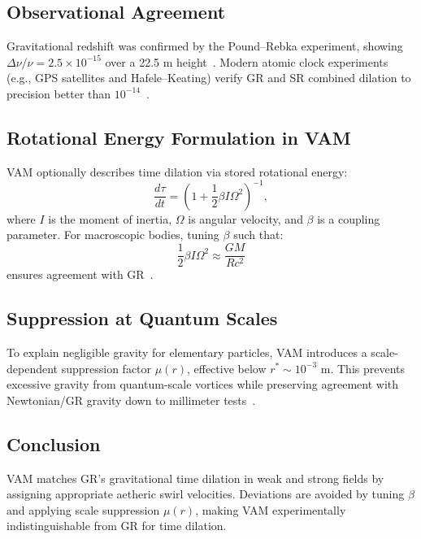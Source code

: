 \subsection*{Observational Agreement}
Gravitational redshift was confirmed by the Pound–Rebka experiment, showing $\Delta\nu/\nu = 2.5\times 10^{-15}$ over a 22.5 m height~\cite{pound1960apparent}. Modern atomic clock experiments (e.g., GPS satellites and Hafele–Keating) verify GR and SR combined dilation to precision better than $10^{-14}$~\cite{ashby2003relativity}.

\subsection*{Rotational Energy Formulation in VAM}
VAM optionally describes time dilation via stored rotational energy:
\[
    \frac{d\tau}{dt} = \left(1 + \frac{1}{2}\beta I \Omega^2\right)^{-1},
\]
where $I$ is the moment of inertia, $\Omega$ is angular velocity, and $\beta$ is a coupling parameter. For macroscopic bodies, tuning $\beta$ such that:
\[
    \frac{1}{2} \beta I \Omega^2 \approx \frac{GM}{Rc^2}
\]
ensures agreement with GR~\cite{iskandarani2025VAM2}.

\subsection*{Suppression at Quantum Scales}
To explain negligible gravity for elementary particles, VAM introduces a scale-dependent suppression factor $\mu(r)$, effective below $r^* \sim 10^{-3}$ m. This prevents excessive gravity from quantum-scale vortices while preserving agreement with Newtonian/GR gravity down to millimeter tests~\cite{adelberger2003tests}.

\subsection*{Conclusion}
VAM matches GR's gravitational time dilation in weak and strong fields by assigning appropriate aetheric swirl velocities. Deviations are avoided by tuning $\beta$ and applying scale suppression $\mu(r)$, making VAM experimentally indistinguishable from GR for time dilation.